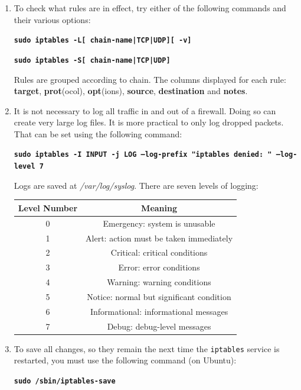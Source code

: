 \documentclass[12pt]{extarticle}
\begin{document}
\begin{enumerate}

\item To check what rules are in effect, try either of the following commands and their various options:

\texttt{\textbf{sudo iptables -L[ chain-name|TCP|UDP][ -v]}}

\texttt{\textbf{sudo iptables -S[ chain-name|TCP|UDP]}}

Rules are grouped according to chain. The columns displayed for each rule: \textbf{target}, \textbf{prot}(ocol), \textbf{opt}(ions), \textbf{source}, \textbf{destination} and \textbf{notes}.

\item It is not necessary to log all traffic in and out of a firewall. Doing so can create very large log files. It is more practical to only log dropped packets. That can be set using the following command:

\texttt{\textbf{sudo iptables -I INPUT -j LOG --log-prefix "iptables denied: " --log-level 7}}

Logs are saved at \textit{/var/log/syslog}. There are seven levels of logging:

\begin{center}
\begin{tabular}{ |c|c| } 
 \hline
Level Number &  Meaning \\
 \hline
0  &     Emergency: system is unusable \\
1  &     Alert: action must be taken immediately \\
2  &     Critical: critical conditions \\
3  &     Error: error conditions \\
4  &     Warning: warning conditions \\
5  &     Notice: normal but significant condition \\
6  &     Informational: informational messages \\
7  &     Debug: debug-level messages \\
 \hline
\end{tabular}
\end{center}

\item To save all changes, so they remain the next time the \texttt{iptables} service is restarted, you must use the following command (on Ubuntu):

\texttt{\textbf{sudo /sbin/iptables-save}}


\end{enumerate}
\end{document}
